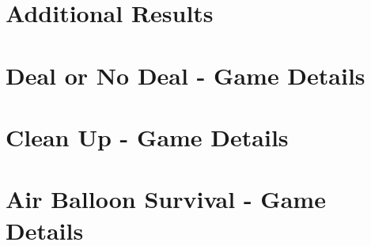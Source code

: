 \documentclass[11pt]{article}
\begin{document}
%






\appendix

\section{Additional Results}\label{sec:appendix_reamining_details}


\section{Deal or No Deal - Game Details}\label{sec:appendix_dond}



\section{Clean Up - Game Details}\label{sec:appendix_clean_up}


\section{Air Balloon Survival - Game Details}\label{sec:appendix_airballoon}

\end{document}
